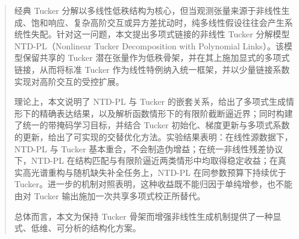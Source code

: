 \begin{abstract}
经典 Tucker 分解以多线性低秩结构为核心，但当观测张量来源于非线性生成、饱和响应、复杂高阶交互或异方差扰动时，纯多线性假设往往会产生系统性失配。针对这一问题，本文提出多项式链接的非线性 Tucker 分解模型 NTD-PL（Nonlinear Tucker Decomposition with Polynomial Links）。该模型保留共享的 Tucker 潜在张量作为低秩骨架，并在其上施加显式的多项式链接，从而将标准 Tucker 作为线性特例纳入统一框架，并以少量链接系数实现对高阶交互的受控扩展。

理论上，本文说明了 NTD-PL 与 Tucker 的嵌套关系，给出了多项式生成情形下的精确表达结果，以及解析函数情形下的有限阶截断逼近界；同时构建了统一的带掩码学习目标，并结合 Tucker 初始化、梯度更新与多项式系数的更新，给出了可实现的交替优化方法。实验结果表明：在线性源数据下，NTD-PL 与 Tucker 基本重合，不会制造伪增益；在统一非线性残差协议下，NTD-PL 在结构匹配与有限阶逼近两类情形中均取得稳定收益；在真实高光谱重构与随机缺失补全任务上，NTD-PL 在同参数预算下持续优于 Tucker。进一步的机制对照表明，这种收益既不能归因于单纯增参，也不能由对 Tucker 输出施加一次共享多项式校正所替代。

总体而言，本文为保持 Tucker 骨架而增强非线性生成机制提供了一种显式、低维、可分析的结构化方案。
\end{abstract}

